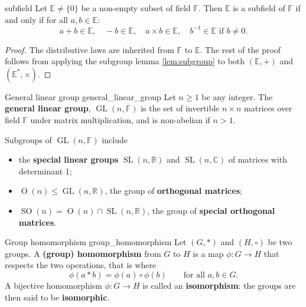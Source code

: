 \begin{lemma}{\cite{math2601_notes}}{subfield}
Let $\mathbb{E} \not = \{0\}$ be a non-empty subset of field $\mathbb{F}$. Then $\mathbb{E}$ is a subfield of $\mathbb{F}$ if and only if for all $a, b \in \mathbb{E}$:
$$ a + b \in \mathbb{E}, \quad -b \in \mathbb{E}, \quad a \times b \in \mathbb{E}, \quad b^{-1} \in \mathbb{E} \text{ if } b \not = 0 . $$

\begin{proof}
The distributive laws are inherited from $\mathbb{F}$ to $\mathbb{E}$. The rest of the proof follows from applying the subgroup lemma \ref{lem:subgroup} to both $(\mathbb{E}, +)$ and $(\mathbb{E}^*, \times)$.
\end{proof}
\end{lemma}

\begin{definition}{General linear group \cite{math2601_notes}}{general_linear_group}
Let $n \geq 1$ be any integer. The \textbf{general linear group}, $\operatorname{GL}(n, \mathbb{F})$ is the set of invertible $n \times n$ matrices over field $\mathbb{F}$ under matrix multiplication, and is non-abelian if $n > 1$.
\end{definition}

Subgroups of $\operatorname{GL}(n, \mathbb{F})$ include
\begin{itemize}
	\item the \textbf{special linear groups} $\operatorname{SL}(n, \mathbb{R})$ and $\operatorname{SL}(n, \mathbb{C})$ of matrices with determinant 1;
	\item $\operatorname{O}(n) \leq \operatorname{GL}(n, \mathbb{R})$, the group of \textbf{orthogonal matrices};
	\item $\operatorname{SO}(n) = \operatorname{O}(n) \cap \operatorname{SL}(n, \mathbb{R})$, the group of \textbf{special orthogonal matrices}.
\end{itemize}

\begin{definition}{Group homomorphism \cite{math2601_notes}}{group_homomorphism}
Let $(G, *)$ and $(H, \circ)$ be two groups. A \textbf{(group) homomorphism} from $G$ to $H$ is a map $\phi : G \to H$ that respects the two operations, that is where
$$ \phi (a * b) = \phi (a) \circ \phi (b) \qquad \text{for all } a, b \in G . $$
A bijective homomorphism $\phi : G \to H$ is called an \textbf{isomorphism}: the groups are then said to be \textbf{isomorphic}.
\end{definition}


